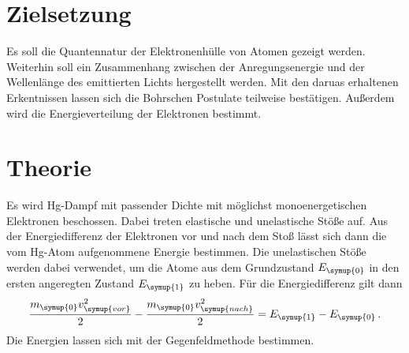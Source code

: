 \section{Zielsetzung}
\label{sec:Zielsetzung}
Es soll die Quantennatur der Elektronenhülle von Atomen gezeigt werden. Weiterhin soll ein Zusammenhang zwischen
der Anregungsenergie und der Wellenlänge des emittierten Lichts hergestellt werden. Mit den daruas erhaltenen
Erkentnissen lassen sich die Bohrschen Postulate teilweise bestätigen. Außerdem wird die Energieverteilung der
Elektronen bestimmt.

\section{Theorie}
\label{sec:Theorie}
Es wird Hg-Dampf mit passender Dichte mit möglichst monoenergetischen Elektronen beschossen. Dabei treten
elastische und unelastische Stöße auf. Aus der Energiedifferenz der Elektronen vor und nach dem Stoß lässt
sich dann die vom Hg-Atom aufgenommene Energie bestimmen. Die unelastischen Stöße werden dabei verwendet, um
die Atome aus dem Grundzustand $E_{\symup{0}}$ in den ersten angeregten Zustand $E_{\symup{1}}$ zu heben.
Für die Energiedifferenz gilt dann
\begin{equation}
    \label{eqn:Ediff}
    \frac{m_{\symup{0}}v_{\symup{vor}}^2}{2} - \frac{m_{\symup{0}}v_{\symup{nach}}^2}{2}
    = E_{\symup{1}} - E_{\symup{0}}\,.
\end{equation}
Die Energien lassen sich mit der Gegenfeldmethode bestimmen.



\cite{sample}

